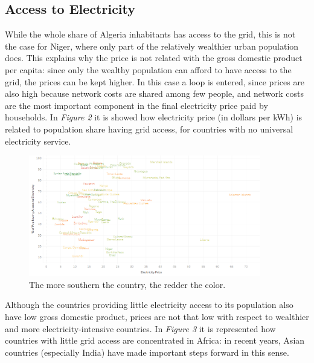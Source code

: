 \documentclass{book}
\begin{document}
\subsection*{Access to Electricity}

While the whole share of Algeria inhabitants has access to the grid, this is not the case for Niger, where only part of the relatively wealthier urban population does. This explains why the price is not related with the gross domestic product per capita: since only the wealthy population can afford to have access to the grid, the prices can be kept higher. In this case a loop is entered, since prices are also high because network costs are shared among few people, and network costs are the most important component in the final electricity price paid by households. In \textit{Figure 2} it is showed how electricity price (in dollars per kWh) is related to population share having grid access, for countries with no universal electricity service.

\bigskip
\begin{figure}[H]
\begin{center}
\captionsetup{justification=centering}
\includegraphics[width=0.9\textwidth]{Images/accessNAMES.png}
\caption{The more southern the country, the redder the color. }
\end{center}
\end{figure}
\bigskip

Although the countries providing little electricity access to its population also have low gross domestic product, prices are not that low with respect to wealthier and more electricity-intensive countries. In \textit{Figure 3} it is represented how countries with little grid access are concentrated in Africa: in recent years, Asian countries (especially India) have made important steps forward in this sense.
\end{document}
